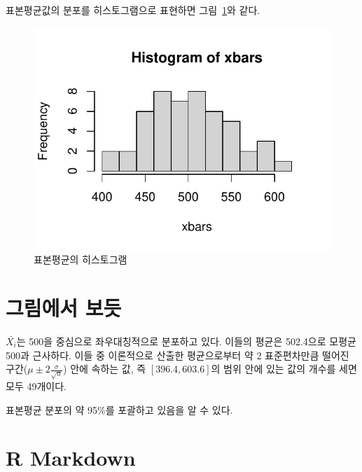 \documentclass[
  chapter,a4paper,showtrims,openright,hidelinks]{oblivoir}
\begin{document}
표본평균값의 분포를 히스토그램으로 표현하면 그림~\ref{fig-test}와
같다.

\begin{figure}

{\centering \includegraphics{clt_files/figure-pdf/fig-test-1.pdf}

}

\caption{\label{fig-test}표본평균의 히스토그램}

\end{figure}

\hypertarget{uxadf8uxb9bcuxc5d0uxc11c-uxbcf4uxb4ef}{%
\section{그림에서 보듯}\label{uxadf8uxb9bcuxc5d0uxc11c-uxbcf4uxb4ef}}

\(\bar{X_i}\)는 500을 중심으로 좌우대칭적으로 분포하고 있다.
이들의 평균은 502.4으로 모평균 500과
근사하다. 이들 중 이론적으로 산출한
평균으로부터 약 2 표준편차만큼 떨어진
구간(\(\mu \pm 2\frac{\sigma}{\sqrt{n}}\)) 안에 속하는 값, 즉
\([396.4, 603.6]\)의 범위 안에 있는 값의 개수를 세면 모두
49개이다.

표본평균 분포의 약 95\%를 포괄하고 있음을 알 수
있다.

\hypertarget{r-markdown}{%
\section{R Markdown}\label{r-markdown}}
\end{document}

